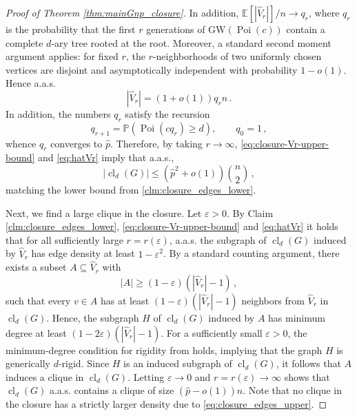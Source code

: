 \documentclass[reqno,english]{amsart}
\numberwithin{equation}{section}
\theoremstyle{definition}{
\newtheorem{example}[theorem]{Example}
\newtheorem{definition}[theorem]{Definition}
\newtheorem*{definition*}{Definition}
\newtheorem{problem}[theorem]{Problem}
\newtheorem{question}[theorem]{Question}
}
\newcommand{\E}{\mathbb E}
\renewcommand{\P}{\mathbb P}
\begin{document}
\begin{proof}[Proof of Theorem \ref{thm:mainGnp_closure}]
In addition, \(\E[|\widehat V_r|]/n\to q_r\), where \(q_r\) is the
probability that the first \(r\) generations of
\(\mathrm{GW}(\operatorname{Poi}(c))\) contain a complete \(d\)-ary
tree rooted at the root. Moreover, a standard second moment argument
applies: for fixed \(r\), the \(r\)-neighborhoods of two uniformly chosen
vertices are disjoint and asymptotically independent with probability
\(1-o(1)\). Hence a.a.s. 
\begin{equation}\label{eq:hatVr}
    |\widehat V_r|=(1+o(1))q_rn\,.
\end{equation}
In addition, the numbers \(q_r\) satisfy the recursion
\[
    q_{r+1}
    =
    \P(\operatorname{Poi}(c q_r)\ge d),
    \qquad q_0=1\,,
\]
whence \(q_r\) converges to $\hat p.$ 
Therefore, by taking $r\to\infty$, 
\eqref{eq:closure-Vr-upper-bound}
and \eqref{eq:hatVr} imply that a.a.s.,
\begin{equation}\label{eq:closure_edges_upper}
\left|\operatorname{cl}_d(G)\right|
    \le
    \left(\hat p^2+o(1)\right)\binom{n}2\,,
\end{equation}
matching the lower bound from \ref{clm:closure_edges_lower}.

\medskip 

Next, we find a large clique in the closure.
Let $\varepsilon>0$. 
By Claim \ref{clm:closure_edges_lower}, 
\eqref{eq:closure-Vr-upper-bound} and 
\eqref{eq:hatVr} it holds that for all sufficiently large $r=r(\varepsilon)$, a.a.s. the subgraph of $\operatorname{cl}_d(G)$ induced by $\widehat V_r$ has edge density at least $1-\varepsilon^2$. By a standard counting argument, there exists a subset
\(A\subseteq \widehat V_r\) with
\[
    |A|\ge (1-\varepsilon)(|\widehat V_r|-1)\,,
\]
such that every $v\in A$ has at least $(1-\varepsilon)(|\widehat V_r|-1)$ neighbors from $\widehat V_r$ in $\operatorname{cl}_d(G)$. Hence, the subgraph $H$ of $\operatorname{cl}_d(G)$ induced by $A$ has minimum degree at least $(1-2\varepsilon)(|\widehat V_r|-1)$.
For a sufficiently small $\varepsilon>0$, the minimum-degree condition for rigidity from \cite{KrivelevichLewMichaeliRigidity} holds, implying that the graph \(H\) is generically \(d\)-rigid. Since \(H\) is an induced subgraph
of \(\operatorname{cl}_d(G)\), it follows that \(A\) induces a clique in
\(\operatorname{cl}_d(G)\). Letting $\varepsilon \to 0$ and $r=r(\varepsilon)\to\infty$ shows that $\operatorname{cl}_d(G)$ a.a.s. contains a clique of size $(\hat p-o(1))n$. Note that no clique in the closure has a strictly larger density due to \eqref{eq:closure_edges_upper}.


\end{proof}
\end{document}

